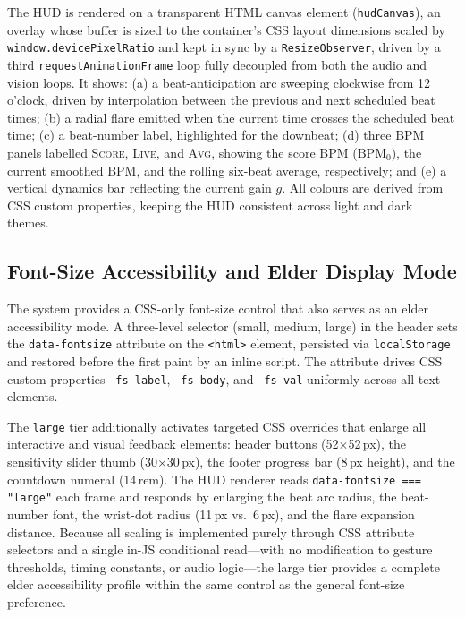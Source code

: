 \documentclass[conference]{IEEEtran}
\begin{document}
The HUD is rendered on a transparent HTML canvas element
(\texttt{hudCanvas}), an overlay whose buffer is sized to the
container's CSS layout dimensions scaled by
\texttt{window.devicePixelRatio} and kept in sync by a
\texttt{ResizeObserver}, driven by a third
\texttt{requestAnimationFrame} loop fully decoupled from both the audio
and vision loops. It shows:
(a) a beat-anticipation arc sweeping clockwise from 12\,o'clock,
driven by interpolation between the previous and next scheduled beat
times; (b) a radial flare emitted when the current time crosses the
scheduled beat time; (c) a beat-number label, highlighted for the
downbeat; (d) three BPM panels labelled \textsc{Score}, \textsc{Live},
and \textsc{Avg}, showing the score BPM ($\text{BPM}_0$), the current
smoothed BPM, and the rolling six-beat average, respectively; and
(e) a vertical dynamics bar reflecting the current gain $g$. All
colours are derived from CSS custom properties, keeping the HUD
consistent across light and dark themes.

\subsection{Font-Size Accessibility and Elder Display Mode}

The system provides a CSS-only font-size control that also serves as an
elder accessibility mode. A three-level selector (small, medium, large)
in the header sets the \texttt{data-fontsize} attribute on the
\texttt{<html>} element, persisted via \texttt{localStorage} and
restored before the first paint by an inline script. The attribute
drives CSS custom properties \texttt{--fs-label}, \texttt{--fs-body},
and \texttt{--fs-val} uniformly across all text elements.

The \texttt{large} tier additionally activates targeted CSS overrides
that enlarge all interactive and visual feedback elements: header
buttons (52$\times$52\,px), the sensitivity slider thumb
(30$\times$30\,px), the footer progress bar (8\,px height), and the
countdown numeral (14\,rem). The HUD renderer reads
\texttt{data-fontsize === "large"} each frame and responds by enlarging
the beat arc radius, the beat-number font, the wrist-dot radius
(11\,px vs.\ 6\,px), and the flare expansion distance. Because all
scaling is implemented purely through CSS attribute selectors and a
single in-JS conditional read---with no modification to gesture
thresholds, timing constants, or audio logic---the large tier provides
a complete elder accessibility profile within the same control as the
general font-size preference.
\end{document}
